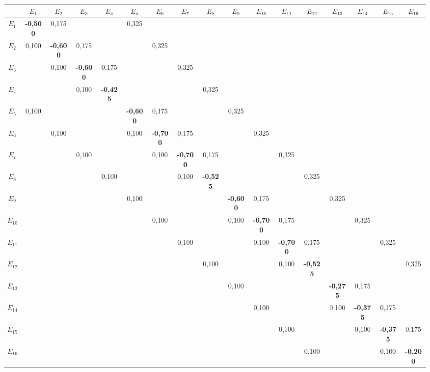 \begin{tabular}{c|cccccccccccccccc}
 & $E_{1}$ & $E_{2}$ & $E_{3}$ & $E_{4}$ & $E_{5}$ & $E_{6}$ & $E_{7}$ & $E_{8}$ & $E_{9}$ & $E_{10}$ & $E_{11}$ & $E_{12}$ & $E_{13}$ & $E_{14}$ & $E_{15}$ & $E_{16}$ \\ \hline
$E_{1}$ & \textbf{-0{,}500} & 0{,}175 &  &  & 0{,}325 &  &  &  &  &  &  &  &  &  &  &  \\
$E_{2}$ & 0{,}100 & \textbf{-0{,}600} & 0{,}175 &  &  & 0{,}325 &  &  &  &  &  &  &  &  &  &  \\
$E_{3}$ &  & 0{,}100 & \textbf{-0{,}600} & 0{,}175 &  &  & 0{,}325 &  &  &  &  &  &  &  &  &  \\
$E_{4}$ &  &  & 0{,}100 & \textbf{-0{,}425} &  &  &  & 0{,}325 &  &  &  &  &  &  &  &  \\
$E_{5}$ & 0{,}100 &  &  &  & \textbf{-0{,}600} & 0{,}175 &  &  & 0{,}325 &  &  &  &  &  &  &  \\
$E_{6}$ &  & 0{,}100 &  &  & 0{,}100 & \textbf{-0{,}700} & 0{,}175 &  &  & 0{,}325 &  &  &  &  &  &  \\
$E_{7}$ &  &  & 0{,}100 &  &  & 0{,}100 & \textbf{-0{,}700} & 0{,}175 &  &  & 0{,}325 &  &  &  &  &  \\
$E_{8}$ &  &  &  & 0{,}100 &  &  & 0{,}100 & \textbf{-0{,}525} &  &  &  & 0{,}325 &  &  &  &  \\
$E_{9}$ &  &  &  &  & 0{,}100 &  &  &  & \textbf{-0{,}600} & 0{,}175 &  &  & 0{,}325 &  &  &  \\
$E_{10}$ &  &  &  &  &  & 0{,}100 &  &  & 0{,}100 & \textbf{-0{,}700} & 0{,}175 &  &  & 0{,}325 &  &  \\
$E_{11}$ &  &  &  &  &  &  & 0{,}100 &  &  & 0{,}100 & \textbf{-0{,}700} & 0{,}175 &  &  & 0{,}325 &  \\
$E_{12}$ &  &  &  &  &  &  &  & 0{,}100 &  &  & 0{,}100 & \textbf{-0{,}525} &  &  &  & 0{,}325 \\
$E_{13}$ &  &  &  &  &  &  &  &  & 0{,}100 &  &  &  & \textbf{-0{,}275} & 0{,}175 &  &  \\
$E_{14}$ &  &  &  &  &  &  &  &  &  & 0{,}100 &  &  & 0{,}100 & \textbf{-0{,}375} & 0{,}175 &  \\
$E_{15}$ &  &  &  &  &  &  &  &  &  &  & 0{,}100 &  &  & 0{,}100 & \textbf{-0{,}375} & 0{,}175 \\
$E_{16}$ &  &  &  &  &  &  &  &  &  &  &  & 0{,}100 &  &  & 0{,}100 & \textbf{-0{,}200} \\
\end{tabular}
